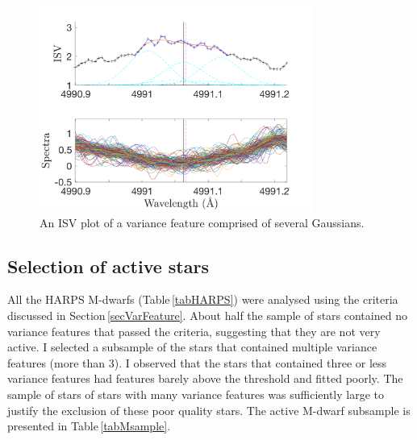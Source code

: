 \begin{figure}
    \centering
    \captionsetup{width=.8\textwidth}
    \includegraphics[width=0.8\textwidth]{GL551_Gaussian_fit_bad.png}
    \caption{An ISV plot of a variance feature comprised of several Gaussians.}
    \label{figGaussian_fitting_bad}
\end{figure}

\subsection{Selection of active stars}
All the HARPS M-dwarfs (Table\,\ref{tabHARPS}) were analysed using the criteria discussed in Section\,\ref{secVarFeature}. About half the sample of stars contained no variance features that passed the criteria, suggesting that they are not very active. I selected a subsample of the stars that contained multiple variance features (more than 3). I observed that the stars that contained three or less variance features had features barely above the threshold and fitted poorly. The sample of stars of stars with many variance features was sufficiently large to justify the exclusion of these poor quality stars. The active M-dwarf subsample is presented in Table\,\ref{tabMsample}.\\ 

